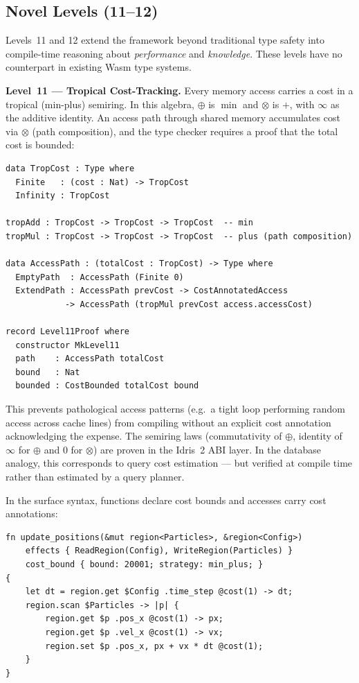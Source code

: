 \documentclass[sigplan,nonacm,screen]{acmart}
\begin{document}
\subsection{Novel Levels (11--12)}

Levels~11 and 12 extend the framework beyond traditional type safety into
compile-time reasoning about \emph{performance} and \emph{knowledge}.
These levels have no counterpart in existing Wasm type systems.

\textbf{Level~11 --- Tropical Cost-Tracking.}
Every memory access carries a cost in a tropical (min-plus) semiring.
In this algebra, $\oplus$ is $\min$ and $\otimes$ is $+$, with
$\infty$ as the additive identity. An access path through shared memory
accumulates cost via $\otimes$ (path composition), and the type checker
requires a proof that the total cost is bounded:

\begin{lstlisting}[language=Idris2,caption={Tropical cost types and Level~11 proof obligation.}]
data TropCost : Type where
  Finite   : (cost : Nat) -> TropCost
  Infinity : TropCost

tropAdd : TropCost -> TropCost -> TropCost  -- min
tropMul : TropCost -> TropCost -> TropCost  -- plus (path composition)

data AccessPath : (totalCost : TropCost) -> Type where
  EmptyPath  : AccessPath (Finite 0)
  ExtendPath : AccessPath prevCost -> CostAnnotatedAccess
            -> AccessPath (tropMul prevCost access.accessCost)

record Level11Proof where
  constructor MkLevel11
  path    : AccessPath totalCost
  bound   : Nat
  bounded : CostBounded totalCost bound
\end{lstlisting}

This prevents pathological access patterns (e.g.\ a tight loop performing
random access across cache lines) from compiling without an explicit cost
annotation acknowledging the expense. The semiring laws (commutativity of
$\oplus$, identity of $\infty$ for $\oplus$ and $0$ for $\otimes$) are
proven in the Idris~2 ABI layer. In the database analogy, this
corresponds to query cost estimation --- but verified at compile time
rather than estimated by a query planner.

In the surface syntax, functions declare cost bounds and accesses carry
cost annotations:

\begin{lstlisting}[language=twasm,caption={Level~11 surface syntax: cost-bounded function.}]
fn update_positions(&mut region<Particles>, &region<Config>)
    effects { ReadRegion(Config), WriteRegion(Particles) }
    cost_bound { bound: 20001; strategy: min_plus; }
{
    let dt = region.get $Config .time_step @cost(1) -> dt;
    region.scan $Particles -> |p| {
        region.get $p .pos_x @cost(1) -> px;
        region.get $p .vel_x @cost(1) -> vx;
        region.set $p .pos_x, px + vx * dt @cost(1);
    }
}
\end{lstlisting}
\end{document}
